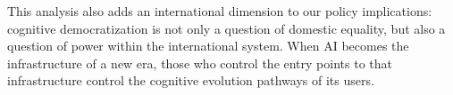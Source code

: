 This analysis also adds an international dimension to our policy implications: cognitive democratization is not only a question of domestic equality, but also a question of power within the international system. When AI becomes the infrastructure of a new era, those who control the entry points to that infrastructure control the cognitive evolution pathways of its users.

